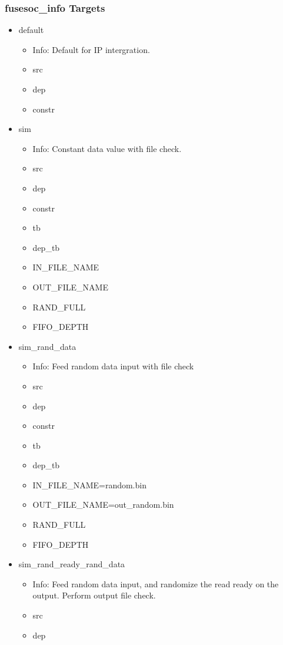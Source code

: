 \subsubsection{fusesoc\_info Targets}
\begin{itemize}
\item default
	\begin{itemize}
	\item[$\space$] Info: Default for IP intergration.
	\item src
	\item dep
	\item constr
	\end{itemize}
\item sim
	\begin{itemize}
	\item[$\space$] Info: Constant data value with file check.
	\item src
	\item dep
	\item constr
	\item tb
	\item dep\_tb
	\item IN\_FILE\_NAME
	\item OUT\_FILE\_NAME
	\item RAND\_FULL
	\item FIFO\_DEPTH
	\end{itemize}
\item sim\_rand\_data
	\begin{itemize}
	\item[$\space$] Info: Feed random data input with file check
	\item src
	\item dep
	\item constr
	\item tb
	\item dep\_tb
	\item IN\_FILE\_NAME=random.bin
	\item OUT\_FILE\_NAME=out\_random.bin
	\item RAND\_FULL
	\item FIFO\_DEPTH
	\end{itemize}
\item sim\_rand\_ready\_rand\_data
	\begin{itemize}
	\item[$\space$] Info: Feed random data input, and randomize the read ready on the output. Perform output file check.
	\item src
	\item dep

\end{itemize}
\end{itemize}
